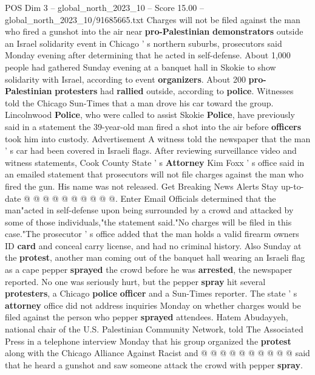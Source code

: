 \begin{textsample}{POS Dim 3 – global\_north\_2023\_10 – Score 15.00 – global\_north\_2023\_10/91685665.txt}  \label{ex:f3_pos_200}
Charges will not be filed against the man who fired a gunshot into the air near \textbf{pro-Palestinian} \textbf{demonstrators} outside an Israel solidarity event in Chicago ' s northern suburbs, prosecutors said Monday evening after determining that he acted in self-defense.
About 1,000 people had gathered Sunday evening at a banquet hall in Skokie to show solidarity with Israel, according to event \textbf{organizers}.
About 200 \textbf{pro-Palestinian} \textbf{protesters} had \textbf{rallied} outside, according to \textbf{police}.
Witnesses told the Chicago Sun-Times that a man drove his car toward the group.
Lincolnwood \textbf{Police}, who were called to assist Skokie \textbf{Police}, have previously said in a statement the 39-year-old man fired a shot into the air before \textbf{officers} took him into custody.
Advertisement A witness told the newspaper that the man ' s car had been covered in Israeli flags.
After reviewing surveillance video and witness statements, Cook County State ' s \textbf{Attorney} Kim Foxx ' s office said in an emailed statement that prosecutors will not file charges against the man who fired the gun.
His name was not released.
Get Breaking News Alerts Stay up-to-date @ @ @ @ @ @ @ @ @ @.
Enter Email Officials determined that the man"acted in self-defense upon being surrounded by a crowd and attacked by some of those individuals,"the statement said."No charges will be filed in this case."The prosecutor ' s office added that the man holds a valid firearm owners ID \textbf{card} and conceal carry license, and had no criminal history.
Also Sunday at the \textbf{protest}, another man coming out of the banquet hall wearing an Israeli flag as a cape pepper \textbf{sprayed} the crowd before he was \textbf{arrested}, the newspaper reported.
No one was seriously hurt, but the pepper \textbf{spray} hit several \textbf{protesters}, a Chicago \textbf{police} \textbf{officer} and a Sun-Times reporter.
The state ' s \textbf{attorney} office did not address inquiries Monday on whether charges would be filed against the person who pepper \textbf{sprayed} attendees.
Hatem Abudayyeh, national chair of the U.S.
Palestinian Community Network, told The Associated Press in a telephone interview Monday that his group organized the \textbf{protest} along with the Chicago Alliance Against Racist and @ @ @ @ @ @ @ @ @ @ said that he heard a gunshot and saw someone attack the crowd with pepper \textbf{spray}.

\end{textsample}
